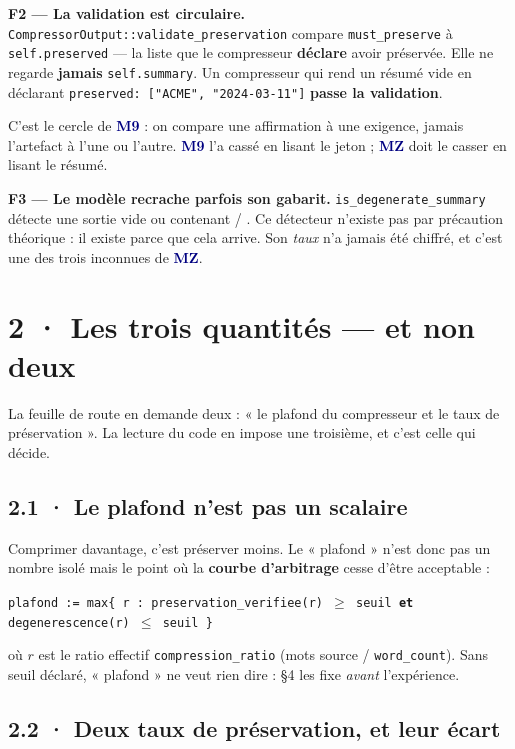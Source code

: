 \documentclass[10pt]{article}
\newcommand{\code}[1]{\texttt{\small #1}}
\newcommand{\mm}[1]{\textbf{\textcolor{navy}{#1}}}
\begin{document}
\begin{alerte}
\textbf{F2 --- La validation est circulaire.} \code{CompressorOutput::validate\_preservation}
compare \code{must\_preserve} à \code{self.preserved} --- la liste que le compresseur \textbf{déclare}
avoir préservée. Elle ne regarde \textbf{jamais} \code{self.summary}. Un compresseur qui rend un
résumé vide en déclarant \code{preserved: ["ACME", "2024-03-11"]} \textbf{passe la validation}.

C'est le cercle de \mm{M9} : on compare une affirmation à une exigence, jamais l'artefact à l'une ou
l'autre. \mm{M9} l'a cassé en lisant le jeton ; \mm{MZ} doit le casser en lisant le résumé.
\end{alerte}

\textbf{F3 --- Le modèle recrache parfois son gabarit.} \code{is\_degenerate\_summary} détecte une
sortie vide ou contenant \code{<the compressed text>} / \code{<source text>}. Ce détecteur n'existe
pas par précaution théorique : il existe parce que cela arrive. Son \emph{taux} n'a jamais été
chiffré, et c'est une des trois inconnues de \mm{MZ}.

\section{2 · Les trois quantités --- et non deux}

La feuille de route en demande deux : « le plafond du compresseur et le taux de préservation ». La
lecture du code en impose une troisième, et c'est celle qui décide.

\subsection{2.1 · Le plafond n'est pas un scalaire}

Comprimer davantage, c'est préserver moins. Le « plafond » n'est donc pas un nombre isolé mais le
point où la \textbf{courbe d'arbitrage} cesse d'être acceptable :

\begin{extrait}\small
\code{plafond := max\{ r : preservation\_verifiee(r) $\geq$ seuil \textbf{et} degenerescence(r) $\leq$ seuil \}}
\end{extrait}

où $r$ est le ratio effectif \code{compression\_ratio} (mots source / \code{word\_count}). Sans
seuil déclaré, « plafond » ne veut rien dire : §4 les fixe \emph{avant} l'expérience.

\subsection{2.2 · Deux taux de préservation, et leur écart}
\end{document}
